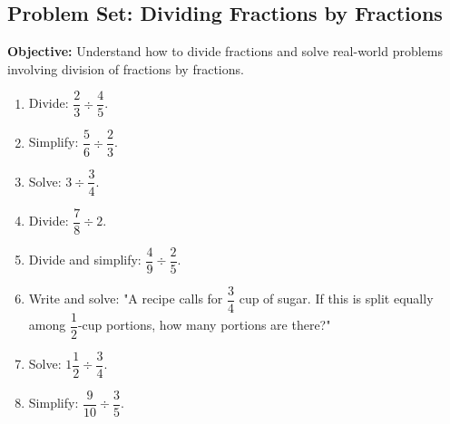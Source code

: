\documentclass[12pt]{article}
\title{}
\date{}
\begin{document}
\subsection*{Problem Set: Dividing Fractions by Fractions}
\onehalfspacing

\begin{tcolorbox}[colframe=black!40, colback=gray!5, 
coltitle=black, colbacktitle=black!20, fonttitle=\bfseries\Large, 
title=Learning Objective, halign title=center, left=5pt, right=5pt, top=5pt, bottom=15pt]
\textbf{Objective:} Understand how to divide fractions and solve real-world problems involving division of fractions by fractions.
\end{tcolorbox}

\begin{tcolorbox}[colframe=black!60, colback=white, 
coltitle=black, colbacktitle=black!15, fonttitle=\bfseries\Large, 
title=Exercises, halign title=center, left=10pt, right=10pt, top=10pt, bottom=60pt]
\begin{enumerate}[itemsep=3em]
    \item Divide: \( \dfrac{2}{3} \div \dfrac{4}{5} \).
    \item Simplify: \( \dfrac{5}{6} \div \dfrac{2}{3} \).
    \item Solve: \( 3 \div \dfrac{3}{4} \).
    \item Divide: \( \dfrac{7}{8} \div 2 \).
    \item Divide and simplify: \( \dfrac{4}{9} \div \dfrac{2}{5} \).
    \item Write and solve: "A recipe calls for \( \dfrac{3}{4} \) cup of sugar. If this is split equally among \( \dfrac{1}{2} \)-cup portions, how many portions are there?"
    \item Solve: \( 1 \dfrac{1}{2} \div \dfrac{3}{4} \).
    \item Simplify: \( \dfrac{9}{10} \div \dfrac{3}{5} \).
\end{enumerate}
\end{tcolorbox}

\vspace{1em}
\end{document}
